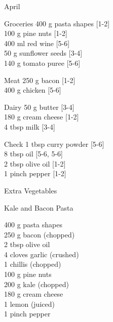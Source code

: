 \begin{menu}{April}
\begin{shoppinglist}{Groceries}
      400 g pasta shapes 
        {\scriptsize[1-2]}\\
      100 g pine nuts 
        {\scriptsize[1-2]}\\
      400 ml red wine 
        {\scriptsize[5-6]}\\
      50 g sunflower seeds 
        {\scriptsize[3-4]}\\
      140 g tomato puree 
        {\scriptsize[5-6]}\\
      \end{shoppinglist}%
      \par\vfil %
      \begin{shoppinglist}{Meat}
      250 g bacon 
        {\scriptsize[1-2]}\\
      400 g chicken 
        {\scriptsize[5-6]}\\
      \end{shoppinglist}%
      \begin{shoppinglist}{Dairy}
      50 g butter 
        {\scriptsize[3-4]}\\
      180 g cream cheese 
        {\scriptsize[1-2]}\\
      4 tbsp milk 
        {\scriptsize[3-4]}\\
      \end{shoppinglist}%
      \par\vfil %
      \vfil\clearpage %
      \begin{shoppinglist}{Check}
      1 tbsp curry powder 
        {\scriptsize[5-6]}\\
      8 tbsp oil 
        {\scriptsize[5-6, 5-6]}\\
      2 tbsp olive oil 
        {\scriptsize[1-2]}\\
      1 pinch pepper 
        {\scriptsize[1-2]}\\
      \end{shoppinglist}%
      \begin{shoppinglist}{Extra Vegetables}
      \end{shoppinglist}%
      \par\vfil %
    \vfil\clearpage
  
    \begin{recipe}{2}{Kale and Bacon Pasta}%
		\begin{ingredients}
		400 g pasta shapes  \\
	250 g bacon (chopped) \\
	2 tbsp olive oil  \\
	4 cloves garlic (crushed) \\
	1  chillis (chopped) \\
	100 g pine nuts  \\
	200 g kale (chopped) \\
	180 g cream cheese  \\
	1  lemon (juiced) \\
	1 pinch pepper  \\
	

\end{ingredients}
\end{recipe}
\end{menu}
